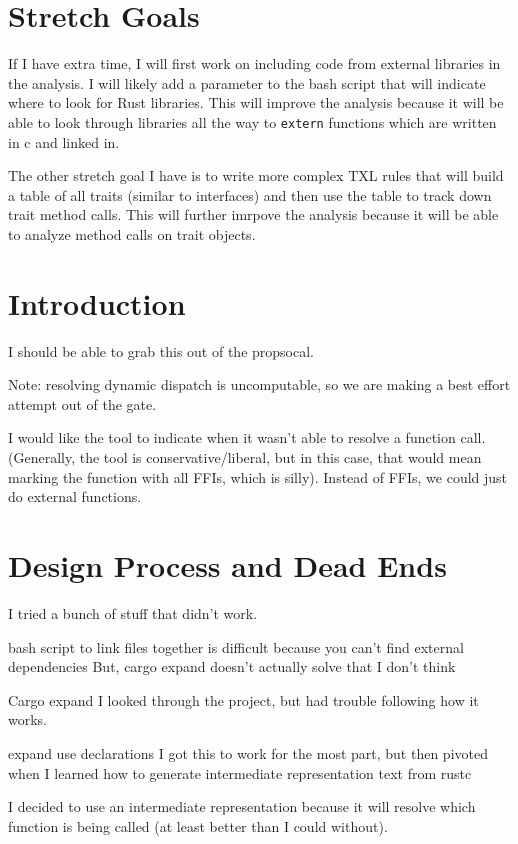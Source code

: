 \documentclass[11pt]{article}
\begin{document}
\section{Stretch Goals}
If I have extra time, I will first work on including code from external libraries in the analysis.
I will likely add a parameter to the bash script that will indicate where to look for Rust libraries.
This will improve the analysis because it will be able to look through libraries all the way to \lstinline{extern} functions which are written in c and linked in.

The other stretch goal I have is to write more complex TXL rules that will build a table of all traits (similar to interfaces) and then use the table to track down trait method calls.
This will further imrpove the analysis because it will be able to analyze method calls on trait objects.

\section{Introduction}
I should be able to grab this out of the propsocal.

Note: resolving dynamic dispatch is uncomputable, so we are making a best effort attempt out of the gate.

I would like the tool to indicate when it wasn't able to resolve a function call.
(Generally, the tool is conservative/liberal, but in this case, that would mean marking the function with all FFIs, which is silly).
Instead of FFIs, we could just do external functions.

\section{Design Process and Dead Ends}
I tried a bunch of stuff that didn't work.

bash script to link files together is difficult because you can't find external dependencies
But, cargo expand doesn't actually solve that I don't think

Cargo expand
I looked through the project, but had trouble following how it works.

expand use declarations
I got this to work for the most part, but then pivoted when I learned how to generate intermediate representation text from rustc

I decided to use an intermediate representation because it will resolve which function is being called (at least better than I could without).
\end{document}
